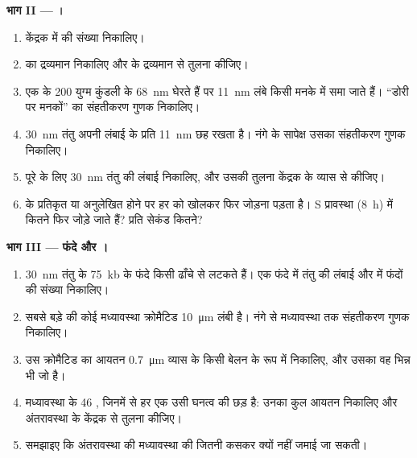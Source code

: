 \begin{problem}
\medskip
\noindent\textbf{भाग II --- ।}
\begin{enumerate}[resume]
  \item केंद्रक में  की संख्या निकालिए।
  \item {} का द्रव्यमान निकालिए और  के द्रव्यमान से तुलना
        कीजिए।
  \item एक  के \qty{200}{} युग्म कुंडली के \qty{68}{nm}
        घेरते हैं पर \qty{11}{nm} लंबे किसी मनके में समा जाते हैं।
        ``डोरी पर मनकों'' का संहतीकरण गुणक निकालिए।
  \item \qty{30}{nm} तंतु अपनी लंबाई के प्रति \qty{11}{nm} छह
         रखता है। नंगे  के सापेक्ष उसका संहतीकरण गुणक
        निकालिए।
  \item पूरे  के लिए \qty{30}{nm} तंतु की लंबाई निकालिए, और उसकी
        तुलना केंद्रक के व्यास से कीजिए।
  \item {} के प्रतिकृत या अनुलेखित होने पर हर  को खोलकर
        फिर जोड़ना पड़ता है। S प्रावस्था (\qty{8}{h}) में कितने
         फिर जोड़े जाते हैं? प्रति सेकंड कितने?
\end{enumerate}

\medskip
\noindent\textbf{भाग III --- फंदे और ।}
\begin{enumerate}[resume]
  \item \qty{30}{nm} तंतु के \qty{75}{kb} के फंदे किसी ढाँचे से लटकते
        हैं। एक फंदे में तंतु की लंबाई और  में फंदों की संख्या
        निकालिए।
  \item सबसे बड़े  की कोई मध्यावस्था क्रोमैटिड
        \qty{10}{\micro m} लंबी है। नंगे  से मध्यावस्था  तक
        संहतीकरण गुणक निकालिए।
  \item उस क्रोमैटिड का आयतन \qty{0.7}{\micro m} व्यास के किसी बेलन के
        रूप में निकालिए, और उसका वह भिन्न भी जो  है।
  \item मध्यावस्था के 46 , जिनमें से हर एक उसी घनत्व की छड़ है:
        उनका कुल आयतन निकालिए और अंतरावस्था के केंद्रक से तुलना कीजिए।
  \item समझाइए कि अंतरावस्था की  मध्यावस्था की  जितनी
        कसकर क्यों नहीं जमाई जा सकती।
\end{enumerate}


\end{problem}

